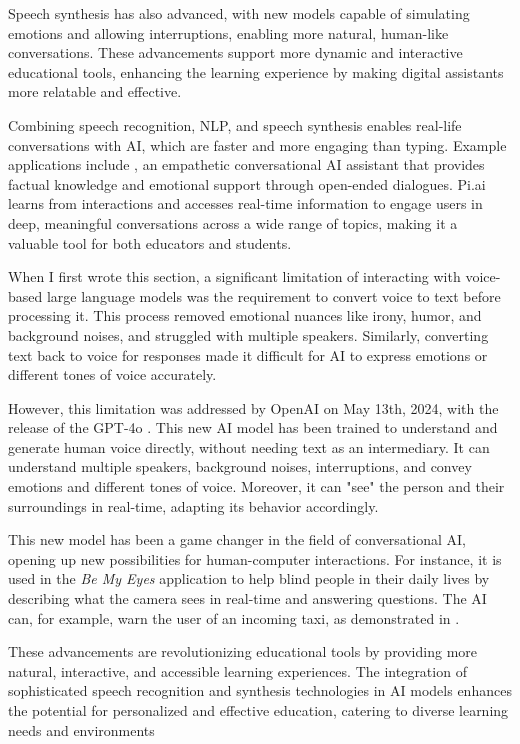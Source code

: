 \documentclass{article}
\begin{document}
Speech synthesis has also advanced, with new models capable
of simulating emotions and allowing interruptions, enabling
more natural, human-like conversations. These advancements
support more dynamic and interactive educational tools,
enhancing the learning experience by making digital assistants
more relatable and effective.

Combining speech recognition, NLP, and speech synthesis
enables real-life conversations with AI, which are faster
and more engaging than typing. Example applications include \cite[Pi.ai]{pi_ai},
an empathetic conversational AI assistant that provides factual knowledge
and emotional support through open-ended dialogues.
Pi.ai learns from interactions and accesses real-time
information to engage users in deep, meaningful conversations across
a wide range of topics, making it a valuable tool
for both educators and students.

When I first wrote this section, a significant limitation
of interacting with voice-based large language models
was the requirement to convert voice to text before
processing it. This process removed emotional nuances like irony,
humor, and background noises, and struggled with multiple speakers.
Similarly, converting text back to voice for responses made it
difficult for AI to express emotions or different tones of voice accurately.

However, this limitation was addressed by OpenAI on May 13th, 2024,
with the release of the GPT-4o \cite{openai_gpt4o}. This
new AI model has been trained to understand and generate
human voice directly, without needing text as an intermediary.
It can understand multiple speakers, background noises, interruptions,
and convey emotions and different tones of voice.
Moreover, it can "see" the person and their surroundings
in real-time, adapting its behavior accordingly.

This new model has been a game changer in the field of conversational
AI, opening up new possibilities for human-computer interactions.
For instance, it is used in the \textit{Be My Eyes} \cite{bemyeyes} application to
help blind people in their daily lives by describing what
the camera sees in real-time and answering questions.
The AI can, for example, warn the user of an incoming taxi,
as demonstrated in \cite{youtube_bemyeyes_gpt4o}.

These advancements are revolutionizing educational tools by providing more natural, interactive, and accessible learning experiences. The integration of sophisticated speech recognition and synthesis technologies in AI models enhances the potential for personalized and effective education, catering to diverse learning needs and environments
\end{document}
